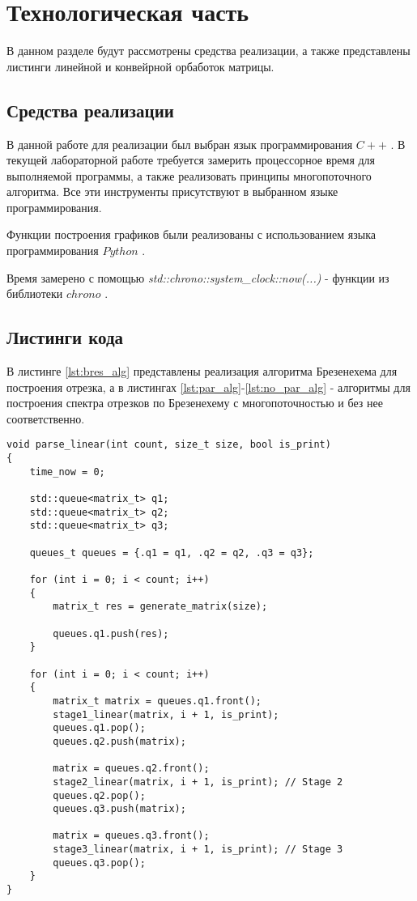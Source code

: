 \chapter{Технологическая часть}

В данном разделе будут рассмотрены средства реализации, а также представлены листинги линейной и конвейрной орбаботок матрицы.

\section{Средства реализации}
В данной работе для реализации был выбран язык программирования $C++$ \cite{cpp-lang}. В текущей лабораторной работе требуется замерить процессорное время для выполняемой программы, а также реализовать принципы многопоточного алгоритма. Все эти инструменты присутствуют в выбранном языке программирования. 

Функции построения графиков были реализованы с использованием языка программирования $Python$ \cite{python-lang}.

Время замерено с помощью \textit{std::chrono::system\_clock::now(...)} - функции из библиотеки $chrono$ \cite{cpp-lang-chrono}.


\section{Листинги кода}

В листинге \ref{lst:bres_alg} представлены реализация алгоритма Брезенехема для построения отрезка, а в листингах \ref{lst:par_alg}-\ref{lst:no_par_alg} - алгоритмы для построения спектра отрезков по Брезенехему с многопоточностью и без нее соответственно.

\clearpage

\begin{center}
    \captionsetup{justification=raggedright,singlelinecheck=off}
    \begin{lstlisting}[label=lst:bres_alg,caption=Алгоритм линейной обработки матрицы]
void parse_linear(int count, size_t size, bool is_print)
{
	time_now = 0;

	std::queue<matrix_t> q1;
	std::queue<matrix_t> q2;
	std::queue<matrix_t> q3;

	queues_t queues = {.q1 = q1, .q2 = q2, .q3 = q3};

	for (int i = 0; i < count; i++)
	{
		matrix_t res = generate_matrix(size);
		
		queues.q1.push(res);
	}

	for (int i = 0; i < count; i++)
	{
		matrix_t matrix = queues.q1.front();
		stage1_linear(matrix, i + 1, is_print);
		queues.q1.pop();
		queues.q2.push(matrix);

		matrix = queues.q2.front();
		stage2_linear(matrix, i + 1, is_print); // Stage 2
		queues.q2.pop();
		queues.q3.push(matrix);

		matrix = queues.q3.front();
		stage3_linear(matrix, i + 1, is_print); // Stage 3
		queues.q3.pop();
	}
}
\end{lstlisting}
\end{center}

